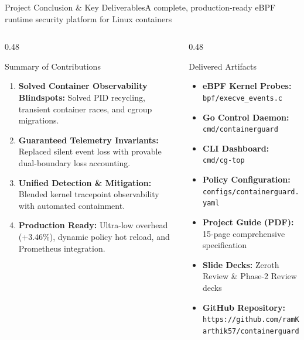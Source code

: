 \documentclass[aspectratio=169,10pt]{beamer}
\begin{document}
\begin{frame}{Project Conclusion \& Key Deliverables}{A complete, production-ready eBPF runtime security platform for Linux containers}
  \begin{columns}[T]
    \begin{column}{0.48\textwidth}
      \begin{block}{Summary of Contributions}
        \scriptsize
        \begin{enumerate}
          \item \textbf{Solved Container Observability Blindspots:} Solved PID recycling, transient container races, and cgroup migrations.
          \item \textbf{Guaranteed Telemetry Invariants:} Replaced silent event loss with provable dual-boundary loss accounting.
          \item \textbf{Unified Detection \& Mitigation:} Blended kernel tracepoint observability with automated containment.
          \item \textbf{Production Ready:} Ultra-low overhead (+3.46\%), dynamic policy hot reload, and Prometheus integration.
        \end{enumerate}
      \end{block}
    \end{column}

    \begin{column}{0.48\textwidth}
      \begin{exampleblock}{Delivered Artifacts}
        \scriptsize
        \begin{itemize}
          \item \textbf{eBPF Kernel Probes:} \texttt{bpf/execve\_events.c}
          \item \textbf{Go Control Daemon:} \texttt{cmd/containerguard}
          \item \textbf{CLI Dashboard:} \texttt{cmd/cg-top}
          \item \textbf{Policy Configuration:} \texttt{configs/containerguard.yaml}
          \item \textbf{Project Guide (PDF):} 15-page comprehensive specification
          \item \textbf{Slide Decks:} Zeroth Review \& Phase-2 Review decks
          \item \textbf{GitHub Repository:} \texttt{https://github.com/ramKarthik57/containerguard}
        \end{itemize}
      \end{exampleblock}
    \end{column}
  \end{columns}
\end{frame}
\end{document}
